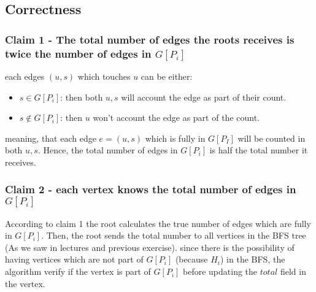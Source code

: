 \documentclass[11pt]{article}
\begin{document}
\begin{enumerate}
\begin{algorithmic}[1]
    \EndIf
    \EndIf
    
            \EndIf
        \EndIf
    \EndIf
\EndFor
\end{algorithmic}
    
\subsection*{Correctness}
\subsubsection*{Claim 1 - The total number of edges the roots receives is twice the number of edges in $G[P_i]$}
each edges $(u,s)$ which touches $u$ can be either:
\begin{itemize}
    \item $s \in G[P_i]$: then both $u,s$ will account the edge as part of their count.
    \item $s \notin G[P_i]$: then $u$ won't account the edge as part of the count.
\end{itemize}
meaning, that each edge $e=(u,s)$ which is fully in $G[P_I]$ will be counted in both $u,s$.
Hence, the total number of edges in $G[P_i]$ is half the total number it receives.

\subsubsection*{Claim 2 - each vertex knows the total number of edges in $G[P_i]$}
According to claim 1 the root calculates the true number of edges which are fully in $G[P_i]$.
Then, the root sends the total number to all vertices in the BFS tree (As we saw in lectures and previous exercise). since there is the possibility of having vertices which are not part of $G[P_i]$ (because $H_i$) in the BFS, the algorithm verify if the vertex is part of $G[P_i]$ before updating the $total$ field in the vertex.




\end{enumerate}
\end{document}
